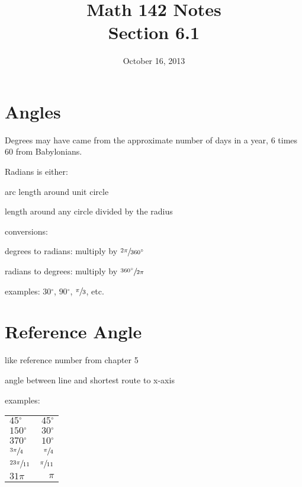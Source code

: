 \documentclass{exam}
\title{Math 142 Notes \\ Section 6.1}
\date{October 16, 2013}
\newcommand{\dg}{\ensuremath{^\circ}}
\begin{document}
  \maketitle
  \tableofcontents

  \section{Angles}

  Degrees may have came from the approximate number of days in a year, 6 times 60 from Babylonians.

  Radians is either:
  \begin{itemize*}
    \item arc length around unit circle
    \item length around any circle divided by the radius
  \end{itemize*}

  conversions:
  \begin{itemize*}
    \item degrees to radians: multiply by $\sfrac{2 \pi}{360 \dg}$
    \item radians to degrees: multiply by $\sfrac{360 \dg}{2 \pi}$
  \end{itemize*}

  examples: $30\dg$, $90\dg$, $\sfrac{\pi}{3}$, etc.

  \section{Reference Angle}
  \begin{itemize*}
    \item like reference number from chapter 5
    \item angle between line and shortest route to x-axis
  \end{itemize*}

  examples:
  \begin{tabular}[H]{lr}
    $45 \dg$             & $45 \dg$ \\
    $150 \dg$            & $30 \dg$ \\
    $370 \dg$            & $10 \dg$ \\
    $\sfrac{3 \pi}{4}$   & $\sfrac{\pi}{4}$ \\
    $\sfrac{23 \pi}{11}$ & $\sfrac{\pi}{11}$ \\
    $31 \pi$             & $\pi$ \\
  \end{tabular}
\end{document}
